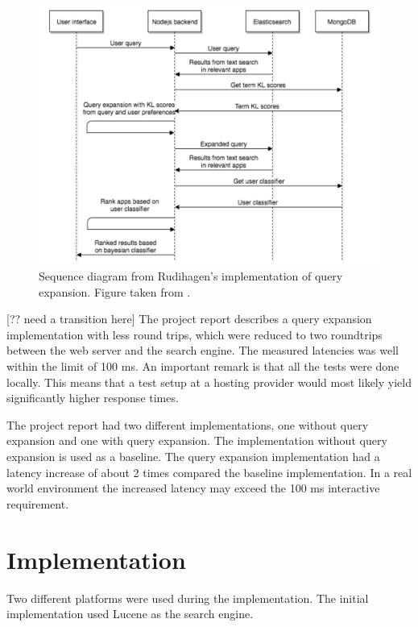 \begin{figure}[h!]
  \centering \includegraphics[width=1\linewidth]{img/sequence-diagram-rudihagen.png}
  \caption{Sequence diagram from Rudihagen's implementation of query expansion. Figure taken from \cite{master-thesis}.}
  \label{fig:sequence-diagram-rudihagen}
\end{figure}

[?? need a transition here]
The project report \cite{project-report} describes a query expansion implementation with less round trips,
which were reduced to two roundtrips between the web server and the search engine.
The measured latencies was well within the limit of 100 ms.
An important remark is that all the tests were done locally.
This means that a test setup at a hosting provider would most likely yield significantly higher response times.

The project report had two different implementations, one without query expansion and one with query expansion.
The implementation without query expansion is used as a baseline.
The query expansion implementation had a latency increase of about 2 times compared the baseline implementation.
In a real world environment the increased latency may exceed the 100 ms interactive requirement.

\section{Implementation}
\label{sec:implementation}
Two different platforms were used during the implementation.
The initial implementation used Lucene as the search engine.

